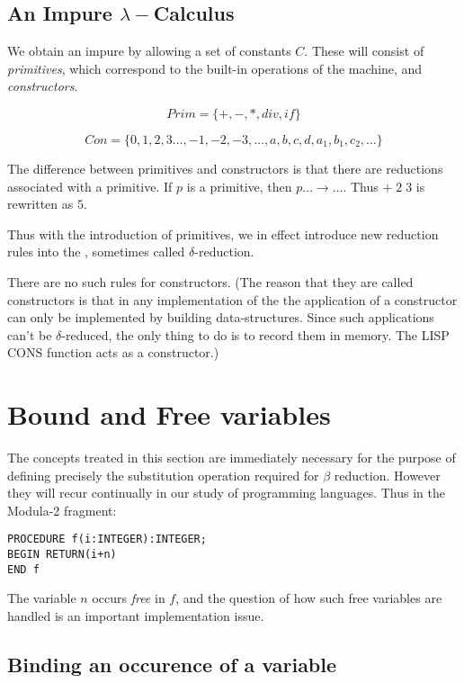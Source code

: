 \subsection{An Impure $\lambda-$Calculus}
We obtain an impure \LC by allowing a set of constants $C$. These will
consist of {\em primitives}, which correspond to the built-in operations
of the machine, and {\em constructors}.

$$Prim = \{+, -, *, div, if\}$$

$$Con = \{0,1,2,3\ldots,-1,-2,-3,\ldots,a,b,c,d,a_1,b_1,c_2,\ldots\}$$

The difference between primitives and constructors is that there are
reductions associated with a primitive.  If $p$ is a primitive, then
$p\ldots \longrightarrow \ldots$. Thus $+\; 2\; 3$ is rewritten as $5$.


Thus with the introduction of primitives, we in effect introduce new
reduction rules into the \LC, sometimes called $\delta$-reduction.


There are no such rules for constructors. (The reason that they are called
constructors is that in any implementation of the \LC the application of a
constructor can only be implemented by building data-structures. Since such
applications can't be $\delta$-reduced, the
only thing to do is to record them in memory. The LISP CONS function acts
as a constructor.)


\section{Bound and Free variables}

The concepts treated in this section are immediately necessary for the
purpose of defining precisely the substitution operation required for
$\beta$ reduction. However they will recur continually in our study of
programming languages.  Thus in the Modula-2 fragment:

\begin{verbatim}
PROCEDURE f(i:INTEGER):INTEGER;
BEGIN RETURN(i+n)
END f
\end{verbatim}

The variable $n$ occurs {\em free} in $f$, and the question of how such
free variables are handled is an important implementation issue.

\subsection{Binding an occurence of a variable}

